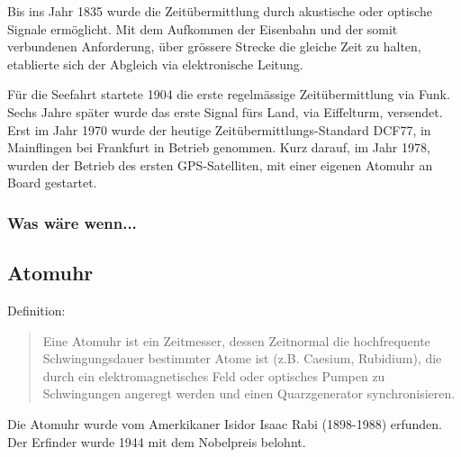 Bis ins Jahr 1835 wurde die Zeitübermittlung durch akustische oder optische Signale ermöglicht.
Mit dem Aufkommen der Eisenbahn und der somit verbundenen Anforderung, über grössere Strecke die gleiche Zeit zu halten, etablierte sich der Abgleich via elektronische Leitung.

Für die Seefahrt startete 1904 die erste regelmässige Zeitübermittlung via Funk. Sechs Jahre später wurde das erste Signal fürs Land, via Eiffelturm, versendet.
Erst im Jahr 1970 wurde der heutige Zeitübermittlungs-Standard DCF77, in Mainflingen bei Frankfurt in Betrieb genommen.
Kurz darauf, im Jahr 1978, wurden der Betrieb des ersten GPS-Satelliten, mit einer eigenen Atomuhr an Board gestartet.



\subsubsection{Was wäre wenn...}


\subsection{Atomuhr}
Definition:
\begin{quote}
Eine Atomuhr ist ein Zeitmesser, dessen Zeitnormal die hochfrequente Schwingungsdauer bestimmter Atome ist (z.B. Caesium, Rubidium), die durch ein elektromagnetisches Feld oder optisches Pumpen zu Schwingungen angeregt werden und einen Quarzgenerator synchronisieren.
\end{quote} %
Die Atomuhr wurde vom Amerkikaner Isidor Isaac Rabi (1898-1988) erfunden. Der Erfinder wurde 1944 mit dem Nobelpreis belohnt.


